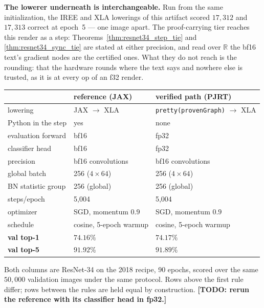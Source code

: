 \medskip\noindent\textbf{The lowerer underneath is interchangeable.} Run
from the same initialization, the IREE and XLA lowerings of
this artifact scored $17{,}312$ and $17{,}313$ correct at epoch~5 --- one
image apart. The proof-carrying tier reaches this render as a step:
Theorems~\ref{thm:resnet34_step_tie} and \ref{thm:resnet34_sync_tie} are
stated at either precision, and read over $\mathbb{R}$ the bf16 text's
gradient nodes are the certified ones. What they do not reach is the
rounding: that the hardware rounds where the text says and nowhere else is
trusted, as it is at every op of an f32 render.


\begin{center}
\begin{tabular}{@{}l l l@{}}
\hline
 & reference (JAX) & verified path (PJRT) \\
\hline
lowering            & JAX $\to$ XLA            & \texttt{pretty(provenGraph)} $\to$ XLA \\
Python in the step  & yes                      & none \\
evaluation forward  & bf16                     & fp32 \\
classifier head     & bf16                     & fp32 \\
\hline
precision           & bf16 convolutions        & bf16 convolutions \\
global batch        & 256 ($4\times64$)        & 256 ($4\times64$) \\
BN statistic group  & 256 (global)             & 256 (global) \\
steps/epoch         & 5{,}004                  & 5{,}004 \\
optimizer           & SGD, momentum $0.9$      & SGD, momentum $0.9$ \\
schedule            & cosine, 5-epoch warmup   & cosine, 5-epoch warmup \\
\hline
\textbf{val top-1}  & $\mathbf{74.16\%}$       & $\mathbf{74.17\%}$ \\
\textbf{val top-5}  & $\mathbf{91.92\%}$       & $\mathbf{91.89\%}$ \\
\hline
\end{tabular}
\end{center}

\noindent Both columns are ResNet-34 on the 2018 recipe, 90 epochs, scored
over the same $50{,}000$ validation images under the same protocol. Rows
above the first rule differ; rows between the rules are held equal by
construction. \textbf{[TODO: rerun the reference with its classifier head
in fp32.]}

